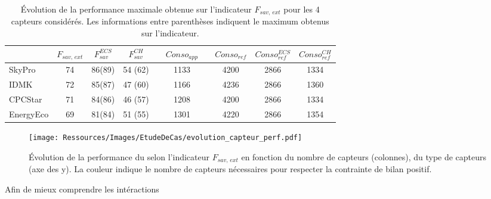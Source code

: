 \begin{table}
\centering
\caption[Performance maximale pouvant être obtenue pour les différents capteurs solaires]
         {Évolution de la performance maximale obtenue sur l’indicateur
          $F_{sav,\, ext}$ pour les \num{4} capteurs considérés. Les informations entre
          parenthèses indiquent le maximum obtenus sur l’indicateur.}
\label{tab:capteur_perf_variation}
\begin{tabular}{l c c c c c c c c c}
    \toprule
              & $F_{sav,\,ext}$ & $F_{sav}^{ECS}$ & $F_{sav}^{CH}$ & &  $Conso_{app}$ & & $Conso_{ref}$ & $Conso_{ref}^{ECS}$ & $Conso_{ref}^{CH}$ \\
    \midrule
    SkyPro    & \num{74} & \num{86}(\num{89}) & \num{54} (\num{62}) & & \num{1133} & & \num{4200} & \num{2866} & \num{1334} \\
    IDMK      & \num{72} & \num{85}(\num{87}) & \num{47} (\num{60}) & & \num{1166} & & \num{4236} & \num{2866} & \num{1360} \\
    CPCStar   & \num{71} & \num{84}(\num{86}) & \num{46} (\num{57}) & & \num{1208} & & \num{4200} & \num{2866} & \num{1334} \\
    EnergyEco & \num{69} & \num{81}(\num{84}) & \num{51} (\num{55}) & & \num{1301} & & \num{4220} & \num{2866} & \num{1354} \\
    \bottomrule
\end{tabular}
\end{table}


\begin{figure}
    \centering
    \texttt{[image: Ressources/Images/EtudeDeCas/evolution\_capteur\_perf.pdf]}
    \caption[Occurences de chaque type de capteurs pour les solutions du front de Pareto]
             {Évolution de la performance du  selon l’indicateur $F_{sav,\,ext}$
              en fonction du nombre de capteurs (colonnes), du type de capteurs (axe des y).
              La couleur indique le nombre de capteurs  nécessaires pour respecter
              la contrainte de bilan positif.}
    \label{fig:occurence_type_capteur}
\end{figure}


Afin de mieux comprendre les intéractions










